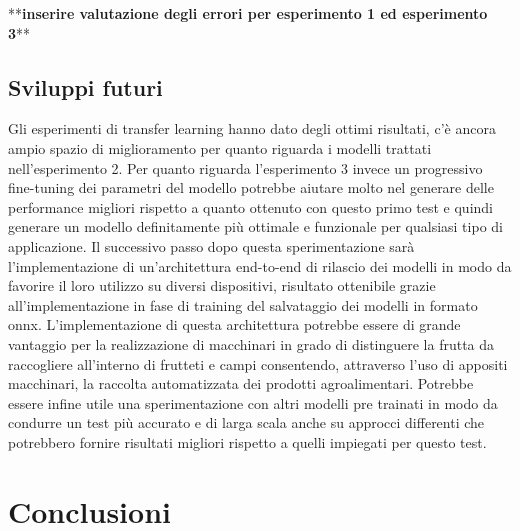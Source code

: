 **\textbf{inserire valutazione degli errori per esperimento 1 ed esperimento 3}**


\subsection{Sviluppi futuri}

Gli esperimenti di transfer learning hanno dato degli ottimi risultati, c'è ancora ampio spazio di miglioramento per quanto riguarda i modelli trattati nell'esperimento 2. Per quanto riguarda l'esperimento 3 invece un progressivo fine-tuning dei parametri del modello potrebbe aiutare molto nel generare delle performance migliori rispetto a quanto ottenuto con questo primo test e quindi generare un modello definitamente più ottimale e funzionale per qualsiasi tipo di applicazione.
Il successivo passo dopo questa sperimentazione sarà l'implementazione di un'architettura end-to-end di rilascio dei modelli in modo da favorire il loro utilizzo su diversi dispositivi, risultato ottenibile grazie all'implementazione in fase di training del salvataggio dei modelli in formato onnx.
L'implementazione di questa architettura potrebbe essere di grande vantaggio per la realizzazione di macchinari in grado di distinguere la frutta da raccogliere all'interno di frutteti e campi consentendo, attraverso l'uso di appositi macchinari, la raccolta automatizzata dei prodotti agroalimentari.
Potrebbe essere infine utile una sperimentazione con altri modelli pre trainati in modo da condurre un test più accurato e di larga scala anche su approcci differenti che potrebbero fornire risultati migliori rispetto a quelli impiegati per questo test.


\section{Conclusioni}

